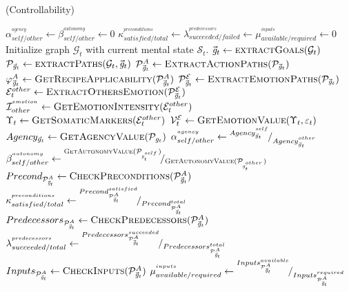 \documentclass{article}
\begin{document}
\begin{algorithm}
	\caption{(Controllability)}
	\label{array-sum}
	\begin{algorithmic}[1]
			\Statex
			\State $\alpha_{self/other}^{^{agency}} \gets
			\beta_{self/other}^{^{autonomy}} \gets 0$
			\Statex
			\State $\kappa_{satisfied/total}^{^{preconditions}} \gets
			\lambda_{succeeded/failed}^{^{predecessors}} \gets
			\mu_{available/required}^{^{inputs}} \gets 0$
			\Statex
			\State Initialize graph $\mathcal{G}_{t}$ with current mental state
			$\mathcal{S}_{t}$.
			\Statex
			\State $\vec{\mathit{g}}_{t} \gets \Call{extractGoals}{\mathcal{G}_{t}}$ 
			\State $\mathcal{P}_{\vec{\mathit{g}}_{t}} \gets
			\Call{extractPaths}{\mathcal{G}_{t}, \vec{\mathit{g}}_{t}}$
			\Statex
			\State $\mathcal{P}_{\vec{\mathit{g}}_{t}}^A \gets
			\Call{ExtractActionPaths} {\mathcal{P}_{\vec{\mathit{g}}_{t}}}$
			\State $\varphi_{\vec{\mathit{g}}_{t}}^A \gets
			\Call{GetRecipeApplicability}{\mathcal{P}_{\vec{\mathit{g}}_{t}}^A}$
			\Statex
			\State $\mathcal{P}_{\vec{\mathit{g}}_{t}}^\mathcal{E} \gets
			\Call{ExtractEmotionPaths} {\mathcal{P}_{\vec{\mathit{g}}_{t}}}$
			\Statex
			\State $\mathcal{E}_t^{other} \gets
			\Call{ExtractOthersEmotion}{\mathcal{P}_{\vec{\mathit{g}}_{t}}^\mathcal{E}}$
			\Statex
			\State $\mathcal{I}_{other}^{^{emotion}} \gets
			\Call{GetEmotionIntensity}{\mathcal{E}_t^{other}}$
			\Statex
			\State $\Upsilon_t \gets \Call{GetSomaticMarkers}{\mathcal{E}_t^{other}}$ 
			\State $\mathcal{V}_{t}^{\mathcal{E}} \gets
			\Call{GetEmotionValue}{\Upsilon_t, \varepsilon_t}$
			\Statex
			\State $Agency_{\vec{g}_t} \gets
			\Call{GetAgencyValue}{\mathcal{P}_{\mathit{g}_{t}}}$ 
			\State $\alpha_{self/other}^{^{agency}} \gets
			{}^{Agency_{\vec{g}_t}^{^{self}}}\!/_{Agency_{\vec{g}_t}^{^{other}}}$
			\Statex
			\State $\beta_{self/other}^{^{autonomy}} \gets
			\rfrac{\Call{GetAutonomyValue}{\mathcal{P}_{\mathit{g}_{t}^{^{self}}}}}
			{\Call{GetAutonomyValue}{\mathcal{P}_{\mathit{g}_{t}^{^{other}}}}}$
			\Statex
			\State $Precond_{\mathcal{P}_{\vec{\mathit{g}}_{t}}^A} \gets
			\Call{CheckPreconditions}{\mathcal{P}_{\vec{\mathit{g}}_{t}}^A}$
			\State $\kappa_{satisfied/total}^{^{preconditions}} \gets
			{}^{Precond_{\mathcal{P}_{\vec{\mathit{g}}_{t}}^A}^{satisfied}}\!/_{Precond_{\mathcal{P}_{\vec{\mathit{g}}_{t}}^A}^{total}}$
			\Statex
			\State $Predecessors_{\mathcal{P}_{\vec{\mathit{g}}_{t}}^A} \gets
			\Call{CheckPredecessors}{\mathcal{P}_{\vec{\mathit{g}}_{t}}^A}$
			\State $\lambda_{succeeded/total}^{^{predecessors}} \gets
			{}^{Predecessors_{\mathcal{P}_{\vec{\mathit{g}}_{t}}^A}^{succeeded}}\!/_{Predecessors_{\mathcal{P}_{\vec{\mathit{g}}_{t}}^A}^{total}}$
			\Statex
			\State $Inputs_{\mathcal{P}_{\vec{\mathit{g}}_{t}}^A} \gets
			\Call{CheckInputs}{\mathcal{P}_{\vec{\mathit{g}}_{t}}^A}$
			\State $\mu_{available/required}^{^{inputs}} \gets
			{}^{Inputs_{\mathcal{P}_{\vec{\mathit{g}}_{t}}^A}^{available}}\!/_{Inputs_{\mathcal{P}_{\vec{\mathit{g}}_{t}}^A}^{required}}$
		\end{algorithmic}
	\end{algorithm}
\end{document}
